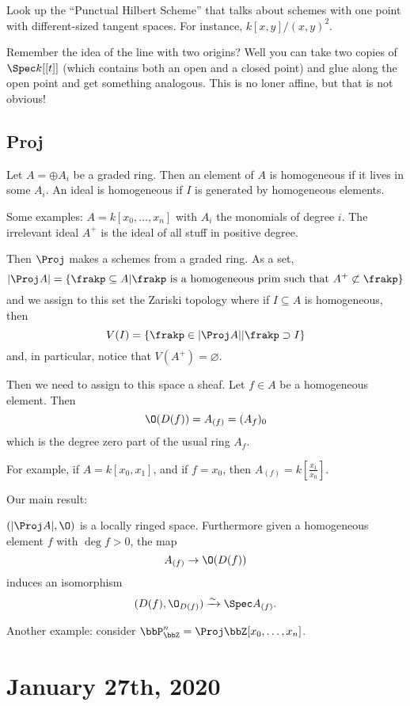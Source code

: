 \documentclass[12pt]{article}
\begin{document}
\begin{rmk}
	Look up the ``Punctual Hilbert Scheme'' that talks about schemes with one point with different-sized tangent spaces. For instance, $k[x,y]/(x,y)^2$.
\end{rmk}

Remember the idea of the line with two origins? Well you can take two copies of $\Spec k[[t]]$ (which contains both an open and a closed point) 
and glue along the open point and get something analogous. This is no loner affine, but that is not obvious!

\subsection{Proj}
Let $A=\oplus A_i$ be a graded ring. Then an element of $A$ is homogeneous if it lives in some $A_i$. An ideal is homogeneous if $I$ 
is generated by homogeneous elements.

Some examples: $A=k[x_0,\dots,x_n]$ with $A_i$ the monomials of degree $i$. The irrelevant ideal $A^+$ is the 
ideal of all stuff in positive degree.

Then $\Proj$ makes a schemes from a graded ring. As a set,
\[|\Proj A|=\{\frakp\subseteq A| \frakp\text{ is a homogeneous prim such that } A^+\not\subset\frakp\}\]
and we assign to this set the Zariski topology where if $I\subseteq A$ is homogeneous, then
\[V(I)=\{\frakp\in|\Proj A||\frakp\supset I\}\]
and, in particular, notice that $V(A^+)=\varnothing.$

Then we need to assign to this space a sheaf. Let $f\in A$ be a homogeneous element. Then 
\[\O(D(f))=A_{(f)}=(A_f)_0\]
which is the degree zero part of the usual ring $A_f$.

For example, if $A=k[x_0,x_1]$, and if $f=x_0$, then $A_{(f)}=k\left[\frac{x_1}{x_0}\right]$.

Our main result: 
\begin{thm}
	$(|\Proj A|,\O)$ is a locally ringed space. Furthermore given a homogeneous element $f$ with $\deg f>0$, the map 
	\[A_{(f)}\to\O(D(f))\]
	induces an isomorphism 
	\[(D(f),\O_{D(f)})\xrightarrow{\sim}\Spec A_{(f)}.\]
\end{thm}
Another example: consider $\bbP_\bbZ^n=\Proj\bbZ[x_0,\dots,x_n]$.

\section{January 27th, 2020}
\end{document}
